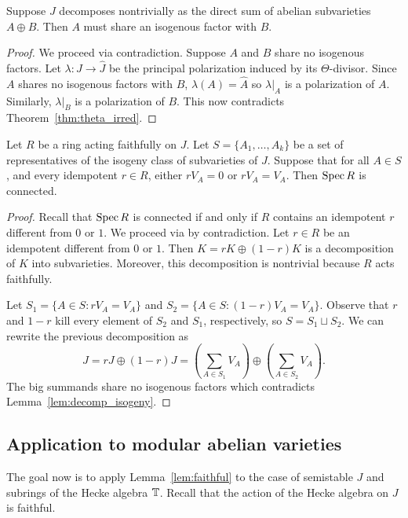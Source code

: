 \documentclass[11pt, proquest]{uwthesis}
\begin{document}
\begin{lemma}
    \label{lem:decomp_isogeny}
    Suppose $J$ decomposes nontrivially as the direct sum of abelian subvarieties
    $A\oplus B$. Then $A$ must share an isogenous factor with $B$.
\end{lemma}
\begin{proof}
    We proceed via contradiction. Suppose $A$ and $B$ share no isogenous
    factors. Let $\lambda:J\to \hat{J}$ be the principal polarization induced
    by its $\Theta$-divisor. Since $A$ shares no isogenous factors with $B$,
    $\lambda(A)=\hat{A}$ so $\lambda|_A$ is a polarization of $A$. Similarly,
    $\lambda|_B$ is a polarization of $B$. This now contradicts
    Theorem~\ref{thm:theta_irred}.
\end{proof}

\begin{lemma}
    \label{lem:faithful}
    Let $R$ be a ring acting faithfully on $J$. Let $S=\{A_1,\ldots,A_k\}$ be a
    set of representatives of the isogeny class of subvarieties of $J$. 
    Suppose that for all $A\in S$, and every idempotent $r\in R$, either
    $rV_A=0$ or $rV_A=V_A$. Then $\operatorname{Spec} R$ is connected.
\end{lemma}
\begin{proof}
    Recall that $\operatorname{Spec} R$ is connected if and only if $R$ contains an
    idempotent $r$ different from $0$ or $1$. We proceed via by contradiction. 
    Let $r\in R$ be an idempotent different from $0$ or $1$. Then $K = rK
    \oplus (1-r) K$ is a decomposition of $K$ into subvarieties. Moreover, this
    decomposition is nontrivial because $R$ acts faithfully.
    
    Let $S_1=\{A\in S:rV_A=V_A\}$ and $S_2=\{A\in S:(1-r)V_A=V_A\}$. Observe
    that $r$ and $1-r$ kill every element of $S_2$ and $S_1$, respectively, so
    $S=S_1\sqcup S_2$. We can rewrite the previous decomposition as
    \[
        J 
        = rJ \oplus (1-r)J
        = \left(\sum_{A\in S_1} V_A \right)
        \oplus \left(\sum_{A\in S_2} V_A \right).
    \]
    The big summands share no isogenous factors which contradicts
    Lemma~\ref{lem:decomp_isogeny}.
\end{proof}

\subsection{Application to modular abelian varieties}

The goal now is to apply Lemma~\ref{lem:faithful} to the case of semistable
$J$ and subrings of the Hecke algebra $\mathbb{T}$. Recall that the action of the
Hecke algebra on $J$ is faithful.
\end{document}
